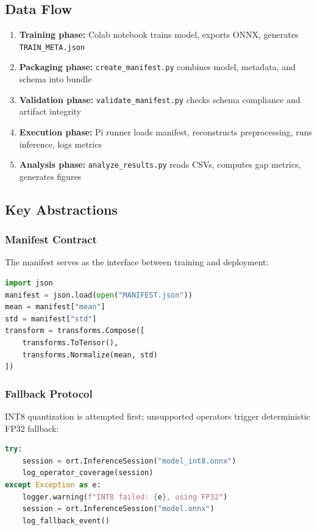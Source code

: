 \documentclass[review]{elsarticle}
\begin{document}
\subsection{Data Flow}

\begin{enumerate}
\item \textbf{Training phase:} Colab notebook trains model, exports ONNX, generates \texttt{TRAIN\_META.json}
\item \textbf{Packaging phase:} \texttt{create\_manifest.py} combines model, metadata, and schema into bundle
\item \textbf{Validation phase:} \texttt{validate\_manifest.py} checks schema compliance and artifact integrity
\item \textbf{Execution phase:} Pi runner loads manifest, reconstructs preprocessing, runs inference, logs metrics
\item \textbf{Analysis phase:} \texttt{analyze\_results.py} reads CSVs, computes gap metrics, generates figures
\end{enumerate}

\subsection{Key Abstractions}

\subsubsection{Manifest Contract}

The manifest serves as the interface between training and deployment:

\begin{lstlisting}[language=Python,caption={Manifest loading and preprocessing reconstruction}]
import json
manifest = json.load(open("MANIFEST.json"))
mean = manifest["mean"]
std = manifest["std"]
transform = transforms.Compose([
    transforms.ToTensor(),
    transforms.Normalize(mean, std)
])
\end{lstlisting}

\subsubsection{Fallback Protocol}

INT8 quantization is attempted first; unsupported operators trigger deterministic FP32 fallback:

\begin{lstlisting}[language=Python,caption={Quantization fallback logic}]
try:
    session = ort.InferenceSession("model_int8.onnx")
    log_operator_coverage(session)
except Exception as e:
    logger.warning(f"INT8 failed: {e}, using FP32")
    session = ort.InferenceSession("model.onnx")
    log_fallback_event()
\end{lstlisting}
\end{document}
